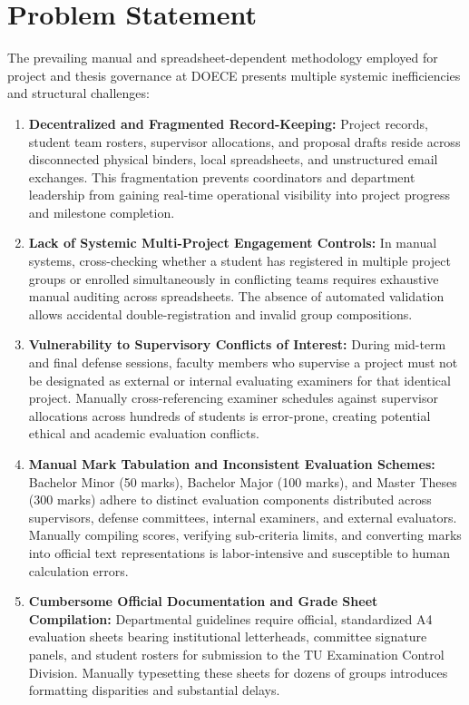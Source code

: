 \section{Problem Statement}
The prevailing manual and spreadsheet-dependent methodology employed for project and thesis governance at DOECE presents multiple systemic inefficiencies and structural challenges:

\begin{enumerate}[label=\textbf{P\arabic*.}]
    \item \textbf{Decentralized and Fragmented Record-Keeping:} Project records, student team rosters, supervisor allocations, and proposal drafts reside across disconnected physical binders, local spreadsheets, and unstructured email exchanges. This fragmentation prevents coordinators and department leadership from gaining real-time operational visibility into project progress and milestone completion.
    
    \item \textbf{Lack of Systemic Multi-Project Engagement Controls:} In manual systems, cross-checking whether a student has registered in multiple project groups or enrolled simultaneously in conflicting teams requires exhaustive manual auditing across spreadsheets. The absence of automated validation allows accidental double-registration and invalid group compositions.
    
    \item \textbf{Vulnerability to Supervisory Conflicts of Interest:} During mid-term and final defense sessions, faculty members who supervise a project must not be designated as external or internal evaluating examiners for that identical project. Manually cross-referencing examiner schedules against supervisor allocations across hundreds of students is error-prone, creating potential ethical and academic evaluation conflicts.
    
    \item \textbf{Manual Mark Tabulation and Inconsistent Evaluation Schemes:} Bachelor Minor (50 marks), Bachelor Major (100 marks), and Master Theses (300 marks) adhere to distinct evaluation components distributed across supervisors, defense committees, internal examiners, and external evaluators. Manually compiling scores, verifying sub-criteria limits, and converting marks into official text representations is labor-intensive and susceptible to human calculation errors.
    
    \item \textbf{Cumbersome Official Documentation and Grade Sheet Compilation:} Departmental guidelines require official, standardized A4 evaluation sheets bearing institutional letterheads, committee signature panels, and student rosters for submission to the TU Examination Control Division. Manually typesetting these sheets for dozens of groups introduces formatting disparities and substantial delays.
    

\end{enumerate}

